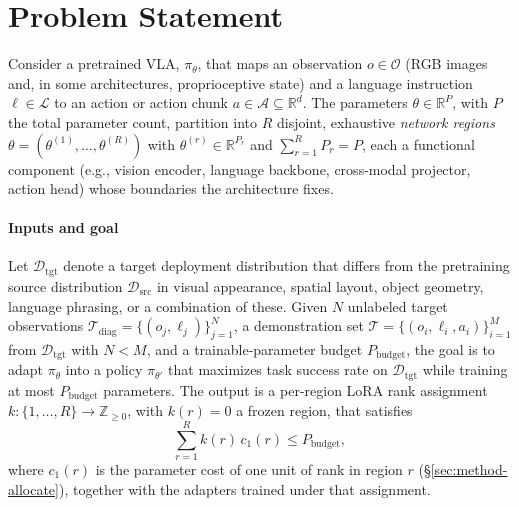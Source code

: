 \section{Problem Statement}
\label{sec:problem}

Consider a pretrained VLA, $\pi_\theta$, that maps an observation $o \in \mathcal{O}$ (RGB images and, in some architectures, proprioceptive state) and a language instruction $\ell \in \mathcal{L}$ to an action or action chunk $a \in \mathcal{A} \subseteq \mathbb{R}^d$.
The parameters $\theta \in \mathbb{R}^P$, with $P$ the total parameter count, partition into $R$ disjoint, exhaustive \emph{network regions} $\theta = (\theta^{(1)}, \dots, \theta^{(R)})$ with $\theta^{(r)} \in \mathbb{R}^{P_r}$ and $\sum_{r=1}^{R} P_r = P$, each a functional component (e.g., vision encoder, language backbone, cross-modal projector, action head) whose boundaries the architecture fixes.

\paragraph{Inputs and goal}
Let $\mathcal{D}_\text{tgt}$ denote a target deployment distribution that differs from the pretraining source distribution $\mathcal{D}_\text{src}$ in visual appearance, spatial layout, object geometry, language phrasing, or a combination of these.
Given $N$ unlabeled target observations $\mathcal{T}_\text{diag} = \{(o_j, \ell_j)\}_{j=1}^{N}$, a demonstration set $\mathcal{T} = \{(o_i, \ell_i, a_i)\}_{i=1}^{M}$ from $\mathcal{D}_\text{tgt}$ with $N < M$, and a trainable-parameter budget $P_\text{budget}$, the goal is to adapt $\pi_\theta$ into a policy $\pi_{\theta'}$ that maximizes task success rate on $\mathcal{D}_\text{tgt}$ while training at most $P_\text{budget}$ parameters.
The output is a per-region LoRA rank assignment $k : \{1, \dots, R\} \to \mathbb{Z}_{\geq 0}$, with $k(r) = 0$ a frozen region, that satisfies
%
\begin{equation}
\label{eq:budget-constraint}
    \sum_{r=1}^{R} k(r)\, c_1(r) \leq P_\text{budget},
\end{equation}
%
where $c_1(r)$ is the parameter cost of one unit of rank in region $r$ (\S\ref{sec:method-allocate}), together with the adapters trained under that assignment.


